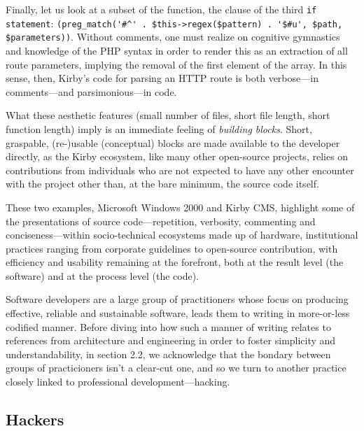 Finally, let us look at a subset of the function, the clause of the third \lstinline{if statement}: \lstinline{(preg_match('#^' . $this->regex($pattern) . '$#u', $path, $parameters))}. Without comments, one must realize on cognitive gymnastics and knowledge of the PHP syntax in order to render this as an extraction of all route parameters, implying the removal of the first element of the array. In this sense, then, Kirby's code for parsing an HTTP route is both verbose—in comments—and parsimonious—in code.

What these aesthetic features (small number of files, short file length, short function length) imply is an immediate feeling of \emph{building blocks}. Short, graspable, (re-)usable (conceptual) blocks are made available to the developer directly, as the Kirby ecosystem, like many other open-source projects, relies on contributions from individuals who are not expected to have any other encounter with the project other than, at the bare minimum, the source code itself.

\vspace*{1\baselineskip}

These two examples, Microsoft Windows 2000 and Kirby CMS, highlight some of the presentations of source code—repetition, verbosity, commenting and conciseness—within socio-technical ecosystems made up of hardware, institutional practices ranging from corporate guidelines to open-source contribution, with efficiency and usability remaining at the forefront, both at the result level (the software) and at the process level (the code).

Software developers are a large group of practitioners whose focus  on producing effective, reliable and sustainable software, leads them to writing in more-or-less codified manner. Before diving into how such a manner of writing relates to references from architecture and engineering in order to foster simplicity and understandability, in section 2.2, we acknowledge that the bondary between groups of practicioners isn't a clear-cut one, and so we turn to another practice closely linked to professional development—hacking.

\subsection{Hackers}

